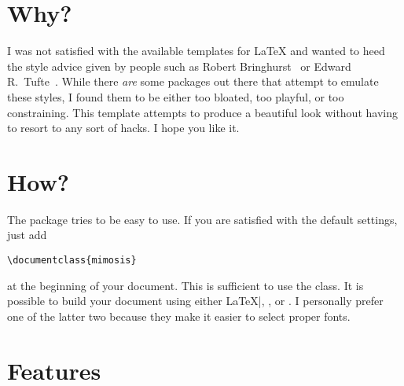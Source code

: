 

\section{Why?}

I was not satisfied with the available templates for \LaTeX{} and wanted
to heed the style advice given by people such as Robert
Bringhurst~\cite{Bringhurst12} or Edward R.\
Tufte~\cite{Tufte90,Tufte01}. While there \emph{are} some packages out
there that attempt to emulate these styles, I found them to be either
too bloated, too playful, or too constraining. This template attempts to
produce a beautiful look without having to resort to any sort of hacks.
I hope you like it.

\section{How?}

The package tries to be easy to use. If you are satisfied with the
default settings, just add
%
\begin{verbatim}
\documentclass{mimosis}
\end{verbatim}
%
at the beginning of your document. This is sufficient to use the class.
It is possible to build your document using either \LaTeX|, \XeLaTeX, or
\LuaLaTeX. I personally prefer one of the latter two because they make
it easier to select proper fonts.

\section{Features}

